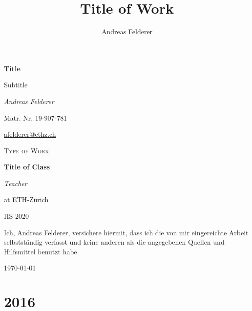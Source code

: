 \documentclass[12pt,a4paper,oneside]{scrartcl}
\author{Andreas Felderer}
\title{Title of Work}
\begin{document}
\begin{titlepage}
	\centering
	\vspace*{2.5cm}

	{\huge\bfseries\sffamily Title \par}
	\vspace{0.5cm}
	{\Large\sffamily Subtitle \par}
	\vspace{0.5cm}
	{\Large\itshape Andreas Felderer\par}
	Matr. Nr. 19-907-781\par
	\href{mailto:afelderer@ethz.ch}{afelderer@ethz.ch}\par
	\vspace{1cm}
	{\scshape\Large Type of Work\par}
	\vspace{0.5cm}
	{\huge\bfseries\sffamily Title of Class \par}
	\vspace{0.5cm}
	{\Large\itshape Teacher\par}
	at ETH-Zürich\par
	HS 2020\par
	\vspace{3cm}
	
	Ich, Andreas Felderer, versichere hiermit, dass ich die von mir eingereichte Arbeit selbstständig verfasst und keine
anderen als die angegebenen Quellen und Hilfsmittel benutzt habe.

	\vfill


	{\large \today \par}
\end{titlepage}

\tableofcontents
\newpage

\section*{2016}

\newpage
\printbibliography
\end{document}
